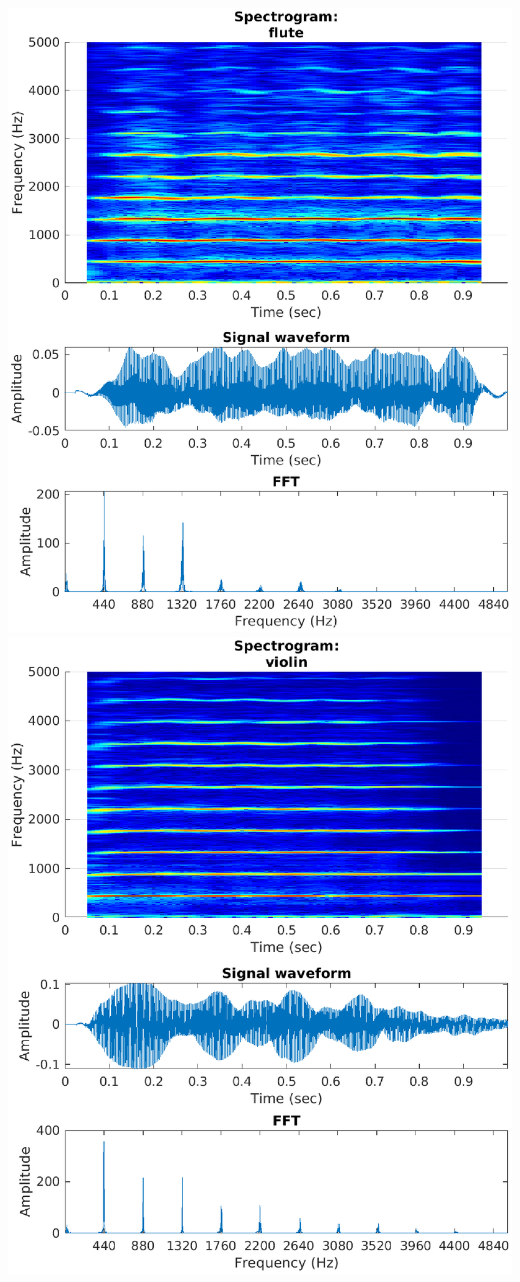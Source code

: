 \documentclass[aspectratio=1610]{beamer}
\begin{document}
\begin{frame}
\includegraphics[height = .55\textheight]{spectrogram_flute}
\includegraphics[height = .55\textheight]{spectrogram_violin}
\end{frame}
\end{document}
